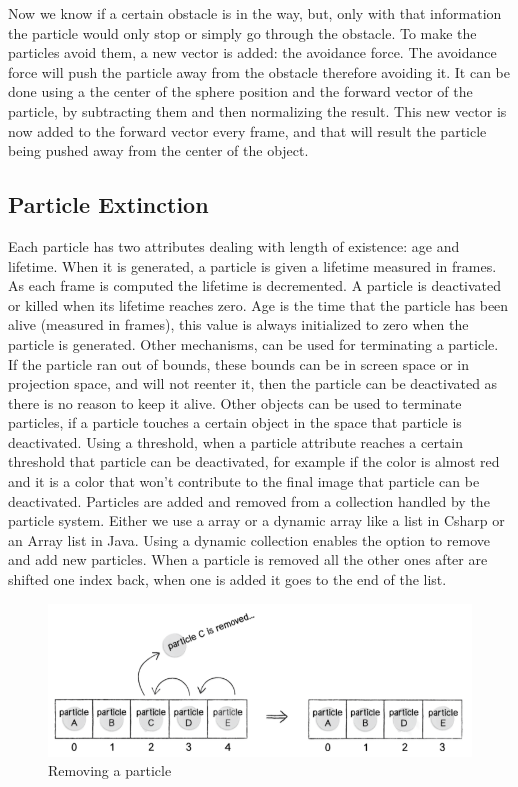 Now we know if a certain obstacle is in the way, but, only with that information the particle would only stop or simply go through the obstacle. To make the particles avoid them, a new vector is added: the avoidance force. The avoidance force will push the particle away from the obstacle therefore avoiding it. It can be done using a the center of the sphere position and the forward vector of the particle, by subtracting them and then normalizing the result. This new vector is now added to the forward vector every frame, and that will result the particle being pushed away from the center of the object. 
\subsection{Particle Extinction}
Each particle has two attributes dealing with length of existence: age and lifetime. When it is generated, a particle is given a lifetime measured in frames. As each frame is computed the lifetime is decremented. A particle is deactivated or killed when its lifetime reaches zero. Age is the time that the particle has been alive (measured in frames), this value is always initialized to zero when the particle is generated. Other mechanisms, can be used for terminating a particle. If the particle ran out of bounds, these bounds can be in screen space or in projection space, and will not reenter it, then the particle can be deactivated as there is no reason to keep it alive. Other objects can be used to terminate particles, if a particle touches a certain object in the space that particle is deactivated. Using a threshold, when a particle attribute reaches a certain threshold that particle can be deactivated, for example if the color is almost red and it is a color that won't contribute to the final image that particle can be deactivated. Particles are added and removed from a collection handled by the particle system. Either we use a array or a dynamic array like a list in Csharp or an Array list in Java. Using a dynamic collection enables the option to remove and add new particles. When a particle is removed all the other ones after are shifted one index back, when one is added it goes to the end of the list.
\begin{figure}[H]
   \includegraphics[scale=0.5]{arrayList}
   \caption{Removing a particle}
   \label{fig:eight}
\end{figure}
